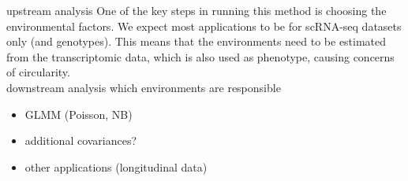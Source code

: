 upstream analysis
One of the key steps in running this method is choosing the environmental factors.
We expect most applications to be for scRNA-seq datasets only (and genotypes).
This means that the environments need to be estimated from the transcriptomic data, which is also used as phenotype, causing concerns of circularity.\\

downstream analysis
which environments are responsible\\

\begin{itemize}
    \item GLMM (Poisson, NB)
    \item additional covariances?
    \item other applications (longitudinal data)
\end{itemize}
